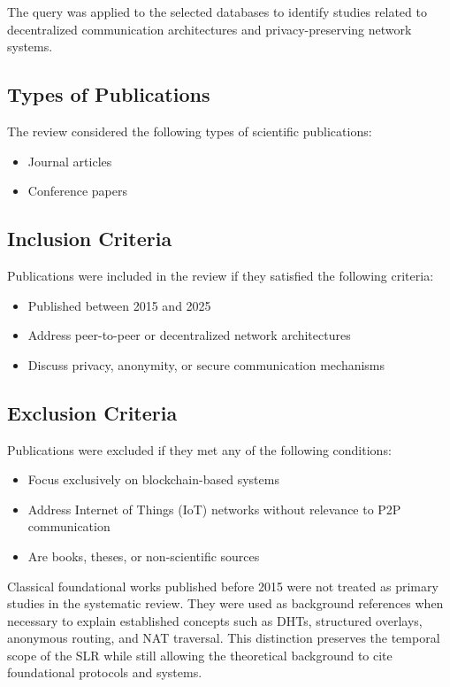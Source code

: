 \documentclass[12pt]{article}
\begin{document}
The query was applied to the selected databases to identify studies related to decentralized communication architectures and privacy-preserving network systems.

\subsection{Types of Publications}

The review considered the following types of scientific publications:

\begin{itemize}
    \item Journal articles
    \item Conference papers
\end{itemize}

\subsection{Inclusion Criteria}

Publications were included in the review if they satisfied the following criteria:

\begin{itemize}
    \item Published between 2015 and 2025
    \item Address peer-to-peer or decentralized network architectures
    \item Discuss privacy, anonymity, or secure communication mechanisms
\end{itemize}

\subsection{Exclusion Criteria}

Publications were excluded if they met any of the following conditions:

\begin{itemize}
    \item Focus exclusively on blockchain-based systems
    \item Address Internet of Things (IoT) networks without relevance to P2P communication
    \item Are books, theses, or non-scientific sources
\end{itemize}

Classical foundational works published before 2015 were not treated as primary studies in the systematic review. They were used as background references when necessary to explain established concepts such as DHTs, structured overlays, anonymous routing, and NAT traversal. This distinction preserves the temporal scope of the SLR while still allowing the theoretical background to cite foundational protocols and systems.
\end{document}
